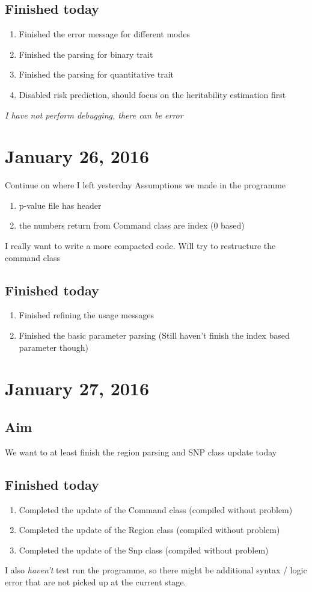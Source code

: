\documentclass[12pt]{article}
\begin{document}
	\subsection{Finished today}
	\begin{enumerate}
		\item Finished the error message for different modes
		\item Finished the parsing for binary trait
		\item Finished the parsing for quantitative trait
		\item Disabled risk prediction, should focus on the heritability estimation first
	\end{enumerate}
	\emph{I have not perform debugging, there can be error}
	\section*{January 26, 2016}
	Continue on where I left yesterday
	Assumptions we made in the programme
	\begin{enumerate}
		\item p-value file has header
		\item the numbers return from Command class are index (0 based)
	\end{enumerate}
	I really want to write a more compacted code.
	Will try to restructure the command class
	\subsection{Finished today}
	\begin{enumerate}
		\item Finished refining the usage messages
		\item Finished the basic parameter parsing (Still haven't finish the index based parameter though)
	\end{enumerate}
	\section*{January 27, 2016}
	\subsection{Aim}
	We want to at least finish the region parsing and SNP class update today
	\subsection{Finished today}
	\begin{enumerate}
		\item Completed the update of the Command class (compiled without problem)
		\item Completed the update of the Region class (compiled without problem)
		\item Completed the update of the Snp class (compiled without problem)
	\end{enumerate}
	I also \emph{haven't} test run the programme, so there might be additional syntax / logic error that are not picked up at the current stage.
	
\end{document}
